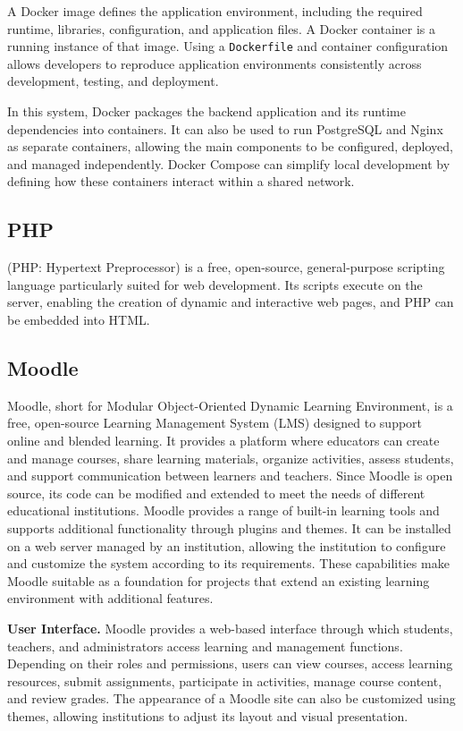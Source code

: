 A Docker image defines the application environment, including
the required runtime, libraries, configuration, and application
files. A Docker container is a running instance of that image.
Using a \texttt{Dockerfile} and container configuration allows
developers to reproduce application environments consistently
across development, testing, and deployment.

In this system, Docker packages the backend application and its
runtime dependencies into containers. It can also be used to run
PostgreSQL and Nginx as separate containers, allowing the main
components to be configured, deployed, and managed independently.
Docker Compose can simplify local development by defining how
these containers interact within a shared network.

\subsection{PHP}

(PHP: Hypertext Preprocessor) is a free, open-source, general-purpose scripting language particularly suited for web development. Its scripts execute on the server, enabling the creation of dynamic and interactive web pages, and PHP can be embedded into HTML.

\subsection{Moodle}
Moodle, short for Modular Object-Oriented Dynamic Learning Environment, is a free, open-source Learning Management System (LMS) designed to support online and blended learning. It provides a platform where educators can create and manage courses, share learning materials, organize activities, assess students, and support communication between learners and teachers. Since Moodle is open source, its code can be modified and extended to meet the needs of different educational institutions. 
Moodle provides a range of built-in learning tools and supports additional functionality through plugins and themes. It can be installed on a web server managed by an institution, allowing the institution to configure and customize the system according to its requirements. These capabilities make Moodle suitable as a foundation for projects that extend an existing learning environment with additional features.

\medskip
\noindent\textbf{User Interface.} Moodle provides a web-based interface through which students, teachers, and administrators access learning and management functions. Depending on their roles and permissions, users can view courses, access learning resources, submit assignments, participate in activities, manage course content, and review grades. The appearance of a Moodle site can also be customized using themes, allowing institutions to adjust its layout and visual presentation. 

